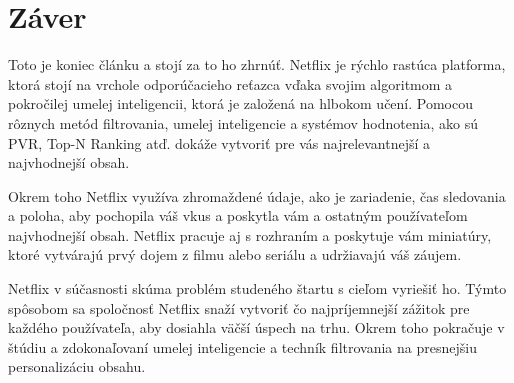 \documentclass[10pt,slovak,a4paper]{article}
\begin{document}
\section{Záver}
Toto je koniec článku a stojí za to ho zhrnúť. Netflix je rýchlo rastúca platforma, ktorá stojí na vrchole odporúčacieho reťazca vďaka svojim algoritmom a pokročilej umelej inteligencii, ktorá je založená na hlbokom učení. Pomocou rôznych metód filtrovania, umelej inteligencie a systémov hodnotenia, ako sú PVR, Top-N Ranking atď. dokáže vytvoriť pre vás najrelevantnejší a najvhodnejší obsah.

Okrem toho Netflix využíva zhromaždené údaje, ako je zariadenie, čas sledovania a poloha, aby pochopila váš vkus a poskytla vám a ostatným používateľom najvhodnejší obsah. Netflix pracuje aj s rozhraním a poskytuje vám miniatúry, ktoré vytvárajú prvý dojem z filmu alebo seriálu a udržiavajú váš záujem.\cite{Zaver}

Netflix v súčasnosti skúma problém studeného štartu s cieľom vyriešiť ho. Týmto spôsobom sa spoločnosť Netflix snaží vytvoriť čo najpríjemnejší zážitok pre každého používateľa, aby dosiahla väčší úspech na trhu. Okrem toho pokračuje v štúdiu a zdokonaľovaní umelej inteligencie a techník filtrovania na presnejšiu personalizáciu obsahu. 


 
\end{document}
